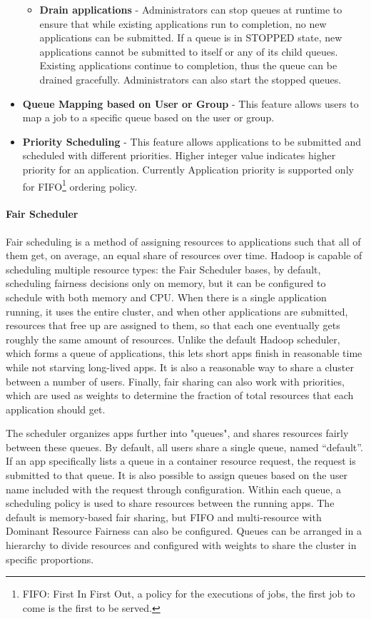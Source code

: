 \begin{itemize}
\begin{itemize}
    \item \textbf{Drain applications} - Administrators can stop queues at runtime to ensure that while existing applications run to completion, no new applications can be submitted. If a queue is in STOPPED state, new applications cannot be submitted to itself or any of its child queues. Existing applications continue to completion, thus the queue can be drained gracefully. Administrators can also start the stopped queues.
    \end{itemize}

\item \textbf{Queue Mapping based on User or Group} - This feature allows users to map a job to a specific queue based on the user or group.

\item \textbf{Priority Scheduling} - This feature allows applications to be submitted and scheduled with different priorities. Higher integer value indicates higher priority for an application. Currently Application priority is supported only for FIFO\footnote{FIFO: First In First Out, a policy for the executions of jobs, the first job to come is the first to be served.} ordering policy.

\end{itemize}

\paragraph{Fair Scheduler}

Fair scheduling is a method of assigning resources to applications such that all of them get, on average, an equal share of resources over time. Hadoop is capable of scheduling multiple resource types:  the Fair Scheduler bases, by default, scheduling fairness decisions only on memory, but it can be configured to schedule with both memory and CPU. When there is a single application running, it uses the entire cluster, and when other applications are submitted, resources that free up are assigned to them, so that each one eventually gets roughly the same amount of resources. Unlike the default Hadoop scheduler, which forms a queue of applications, this lets short apps finish in reasonable time while not starving long-lived apps. It is also a reasonable way to share a cluster between a number of users. Finally, fair sharing can also work with priorities, which are used as weights to determine the fraction of total resources that each application should get.

The scheduler organizes apps further into "queues", and shares resources fairly between these queues. By default, all users share a single queue, named “default”. If an app specifically lists a queue in a container resource request, the request is submitted to that queue. It is also possible to assign queues based on the user name included with the request through configuration. Within each queue, a scheduling policy is used to share resources between the running apps. The default is memory-based fair sharing, but FIFO and multi-resource with Dominant Resource Fairness can also be configured. Queues can be arranged in a hierarchy to divide resources and configured with weights to share the cluster in specific proportions.

